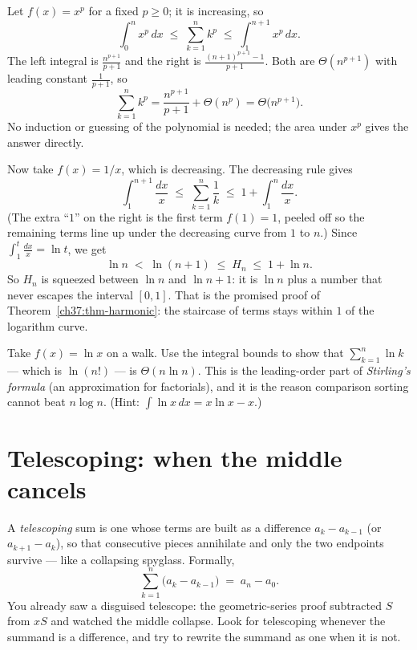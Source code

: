 \begin{example}[Why $\sum k^p = \Theta(n^{p+1})$]
\label{ch37:ex-poly-integral}
Let $f(x) = x^p$ for a fixed $p \ge 0$; it is increasing, so
\[
  \int_{0}^{n} x^p\,dx \;\le\; \sum_{k=1}^{n} k^p \;\le\; \int_{1}^{n+1} x^p\,dx.
\]
The left integral is $\tfrac{n^{p+1}}{p+1}$ and the right is
$\tfrac{(n+1)^{p+1}-1}{p+1}$. Both are $\Theta(n^{p+1})$ with leading constant
$\tfrac{1}{p+1}$, so
\[
  \sum_{k=1}^{n} k^p = \frac{n^{p+1}}{p+1} + \Theta(n^p) = \Theta\bigl(n^{p+1}\bigr).
\]
No induction or guessing of the polynomial is needed; the area under $x^p$
gives the answer directly.
\end{example}

\begin{example}
\label{ch37:ex-harmonic-integral}
Now take $f(x) = 1/x$, which is decreasing. The decreasing rule gives
\[
  \int_{1}^{n+1}\frac{dx}{x} \;\le\; \sum_{k=1}^{n}\frac1k \;\le\; 1 + \int_{1}^{n}\frac{dx}{x}.
\]
(The extra ``$1$'' on the right is the first term $f(1)=1$, peeled off so the
remaining terms line up under the decreasing curve from $1$ to $n$.) Since
$\int_1^{t} \tfrac{dx}{x} = \ln t$, we get
\[
  \ln n \;<\; \ln(n+1) \;\le\; H_n \;\le\; 1 + \ln n.
\]
So $H_n$ is squeezed between $\ln n$ and $\ln n + 1$: it is $\ln n$ plus a number
that never escapes the interval $[0,1]$. That is the promised proof of
Theorem~\ref{ch37:thm-harmonic}: the staircase of terms stays within $1$ of
the logarithm curve.
\end{example}

\begin{walkbox}
Take $f(x) = \ln x$ on a walk. Use the integral bounds to show that
$\sum_{k=1}^{n} \ln k$ --- which is $\ln(n!)$ --- is $\Theta(n \ln n)$. This is
the leading-order part of \emph{Stirling's formula} (an approximation for factorials), and it is the reason
comparison sorting cannot beat $n\log n$. (Hint: $\int \ln x\,dx = x\ln x - x$.)
\end{walkbox}

\section{Telescoping: when the middle cancels}
\label{ch37:telescoping}

A \emph{telescoping} sum is one whose terms are built as a difference
$a_{k} - a_{k-1}$ (or $a_{k+1} - a_k$), so that consecutive pieces annihilate and
only the two endpoints survive --- like a collapsing spyglass. Formally,
\[
  \sum_{k=1}^{n}\bigl(a_k - a_{k-1}\bigr) \;=\; a_n - a_0 .
\]
You already saw a disguised telescope: the geometric-series proof subtracted $S$
from $xS$ and watched the middle collapse. Look for telescoping whenever the
summand is a difference, and try to rewrite the summand as one when it is not.

